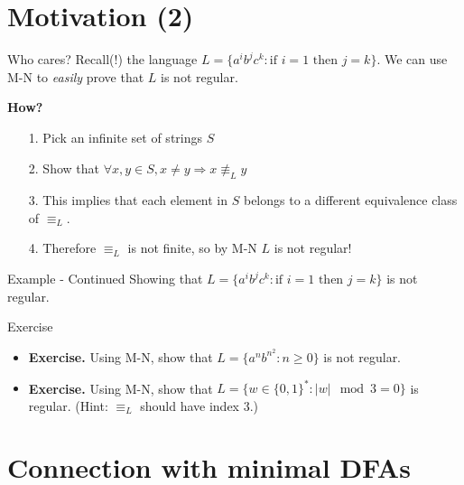 \documentclass[10pt]{beamer}
\begin{document}
\section{Motivation (2)}

\begin{frame}[t]{Who cares?}
    Recall(!) the language $L = \{a^ib^jc^k : \text{if } i = 1 \text{ then } j = k\}$. We can use M-N to \textit{easily} prove that $L$ is not regular.

    \textbf{How?}
    \begin{itemize}
        \item[1.] Pick an infinite set of strings $S$
        \item[2.] Show that $\forall x, y \in S, x \neq y \Rightarrow x \not\equiv_L y$
        \item[3.] This implies that each element in $S$ belongs to a different equivalence class of $\equiv_L$.
        \item[4.] Therefore $\equiv_L$ is not finite, so by M-N $L$ is not regular!
    \end{itemize}

\end{frame}

\begin{frame}[t]{Example - Continued}
    Showing that $L = \{a^ib^jc^k : \text{if } i = 1 \text{ then } j = k\}$ is not regular.
\end{frame}

\begin{frame}[t]{Exercise}
    \begin{itemize}
        \setlength\itemsep{7em}
        \item \textbf{Exercise.} Using M-N, show that $L = \{a^n b^{n^2} : n \geq 0 \}$ is not regular.
        \item \textbf{Exercise.} Using M-N, show that $L = \{w \in \{0,1\}^* : |w| \mod 3 = 0\}$ is regular. (Hint: $\equiv_L$ should have index 3.)
    \end{itemize}
\end{frame}

\section{Connection with minimal DFAs}
\end{document}

